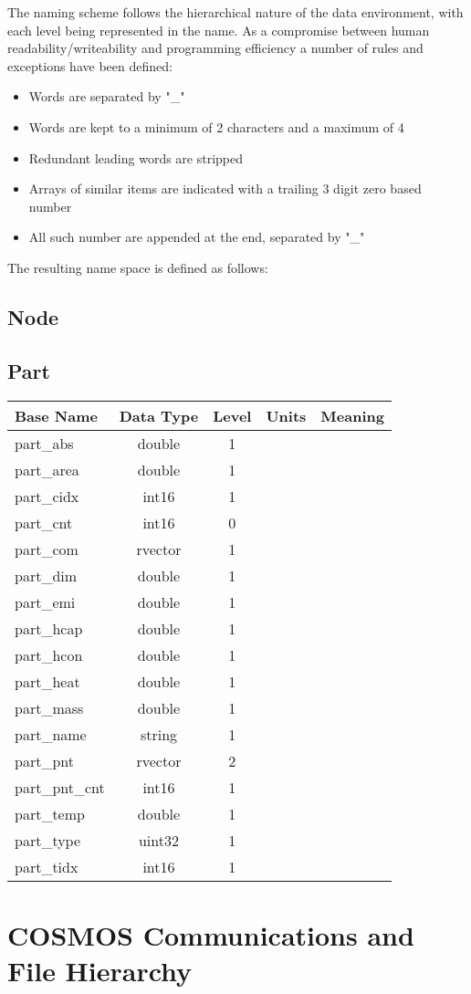 \documentclass[10pt,letterpaper]{report}
\begin{document}
The naming scheme follows the hierarchical nature of the data environment, with each level being represented in the name. As a compromise between human readability/writeability and programming efficiency a number of rules and exceptions have been defined:
\begin{itemize}
\item Words are separated by "\_"
\item Words are kept to a minimum of 2 characters and a maximum of 4
\item Redundant leading words are stripped
\item Arrays of similar items are indicated with a trailing 3 digit zero based number
\item All such number are appended at the end, separated by "\_"
\end{itemize}
The resulting name space is defined as follows:
\section{Node}

\section{Part}
\begin{tabular}{|l|c|c|l|l|}
\hline \textbf{Base Name} &\textbf{Data Type}  & \textbf{Level} & \textbf{Units} & \textbf{Meaning}\\ 
\hline part\_abs & double & 1 &  &  \\ 
\hline part\_area & double & 1 &  &  \\ 
\hline part\_cidx & int16 & 1 &  &  \\ 
\hline part\_cnt & int16 & 0 &  &  \\ 
\hline part\_com & rvector & 1 &  &  \\ 
\hline part\_dim & double & 1 &  &  \\ 
\hline part\_emi & double & 1 &  &  \\ 
\hline part\_hcap & double & 1 &  &  \\ 
\hline part\_hcon & double & 1 &  &  \\ 
\hline part\_heat & double & 1 &  &  \\ 
\hline part\_mass & double & 1 &  &  \\ 
\hline part\_name & string & 1 &  &  \\ 
\hline part\_pnt & rvector & 2 &  &  \\ 
\hline part\_pnt\_cnt & int16 & 1 &  &  \\ 
\hline part\_temp & double & 1 &  &  \\ 
\hline part\_type & uint32 & 1 &  &  \\ 
\hline part\_tidx & int16 & 1 &  &  \\ 
\hline
\end{tabular}
\chapter{COSMOS Communications and File Hierarchy}
\end{document}

